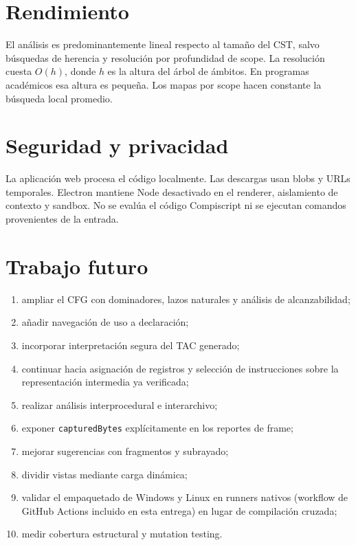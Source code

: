 \documentclass[11pt,letterpaper,oneside]{report}
\newcommand{\codigo}[1]{\texttt{#1}}
\begin{document}
\section{Rendimiento}

El análisis es predominantemente lineal respecto al tamaño del CST, salvo búsquedas
de herencia y resolución por profundidad de scope. La resolución cuesta
\(O(h)\), donde \(h\) es la altura del árbol de ámbitos. En programas académicos esa
altura es pequeña. Los mapas por scope hacen constante la búsqueda local promedio.

\section{Seguridad y privacidad}

La aplicación web procesa el código localmente. Las descargas usan blobs y URLs
temporales. Electron mantiene Node desactivado en el renderer, aislamiento de contexto
y sandbox. No se evalúa el código Compiscript ni se ejecutan comandos provenientes de
la entrada.

\section{Trabajo futuro}

\begin{enumerate}
  \item ampliar el CFG con dominadores, lazos naturales y análisis de alcanzabilidad;
  \item añadir navegación de uso a declaración;
  \item incorporar interpretación segura del TAC generado;
  \item continuar hacia asignación de registros y selección de instrucciones sobre
        la representación intermedia ya verificada;
  \item realizar análisis interprocedural e interarchivo;
  \item exponer \codigo{capturedBytes} explícitamente en los reportes de frame;
  \item mejorar sugerencias con fragmentos y subrayado;
  \item dividir vistas mediante carga dinámica;
  \item validar el empaquetado de Windows y Linux en runners nativos (workflow de
        GitHub Actions incluido en esta entrega) en lugar de compilación cruzada;
  \item medir cobertura estructural y mutation testing.
\end{enumerate}
\end{document}
